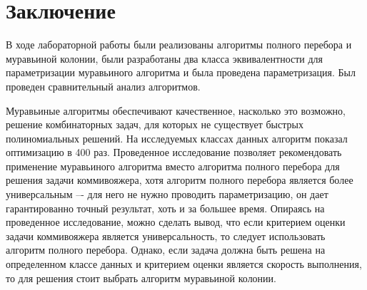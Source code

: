 \newpage
\section*{\large Заключение}
    \par В ходе лабораторной работы были реализованы алгоритмы полного перебора и муравьиной колонии, были разработаны два класса эквивалентности для параметризации муравьиного алгоритма и была проведена параметризация. Был проведен сравнительный анализ алгоритмов.
	\par Муравьиные алгоритмы обеспечивают качественное, насколько это возможно, решение комбинаторных задач, для которых не существует быстрых полиномиальных решений. На исследуемых классах данных алгоритм показал оптимизацию в 400 раз. Проведенное исследование позволяет рекомендовать применение муравьиного алгоритма вместо алгоритма полного перебора для решения задачи коммивояжера, хотя алгоритм полного перебора является более универсальным –- для него не нужно проводить параметризацию, он дает гарантированно точный результат, хоть и за большее время. Опираясь на проведенное исследование, можно сделать вывод, что если критерием оценки задачи коммивояжера является универсальность, то следует использовать алгоритм полного перебора. Однако, если задача должна быть решена на определенном классе данных и критерием оценки является скорость выполнения, то для решения стоит выбрать алгоритм муравьиной колонии.
\newpage
